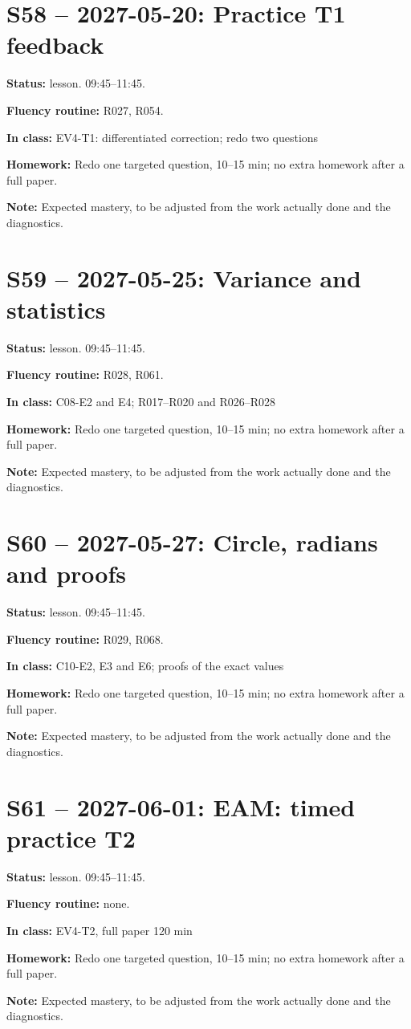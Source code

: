 \section*{S58 -- 2027-05-20: Practice T1 feedback}
\textbf{Status:} lesson. 09:45–11:45.\par\textbf{Fluency routine:} R027, R054.\par\textbf{In class:} EV4-T1: differentiated correction; redo two questions\par\textbf{Homework:} Redo one targeted question, 10–15 min; no extra homework after a full paper.\par\textbf{Note:} Expected mastery, to be adjusted from the work actually done and the diagnostics.
\section*{S59 -- 2027-05-25: Variance and statistics}
\textbf{Status:} lesson. 09:45–11:45.\par\textbf{Fluency routine:} R028, R061.\par\textbf{In class:} C08-E2 and E4; R017–R020 and R026–R028\par\textbf{Homework:} Redo one targeted question, 10–15 min; no extra homework after a full paper.\par\textbf{Note:} Expected mastery, to be adjusted from the work actually done and the diagnostics.
\section*{S60 -- 2027-05-27: Circle, radians and proofs}
\textbf{Status:} lesson. 09:45–11:45.\par\textbf{Fluency routine:} R029, R068.\par\textbf{In class:} C10-E2, E3 and E6; proofs of the exact values\par\textbf{Homework:} Redo one targeted question, 10–15 min; no extra homework after a full paper.\par\textbf{Note:} Expected mastery, to be adjusted from the work actually done and the diagnostics.
\section*{S61 -- 2027-06-01: EAM: timed practice T2}
\textbf{Status:} lesson. 09:45–11:45.\par\textbf{Fluency routine:} none.\par\textbf{In class:} EV4-T2, full paper 120 min\par\textbf{Homework:} Redo one targeted question, 10–15 min; no extra homework after a full paper.\par\textbf{Note:} Expected mastery, to be adjusted from the work actually done and the diagnostics.
